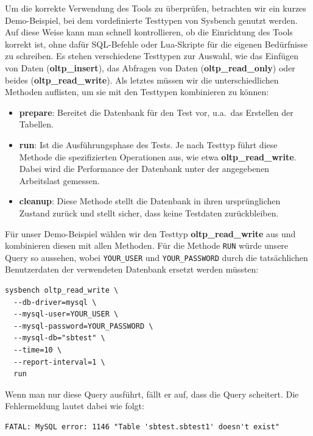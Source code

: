 Um die korrekte Verwendung des Tools zu überprüfen, betrachten wir ein kurzes Demo-Beispiel, bei dem vordefinierte Testtypen von Sysbench genutzt werden.
Auf diese Weise kann man schnell kontrollieren, ob die Einrichtung des Tools korrekt ist, ohne dafür SQL-Befehle oder Lua-Skripte für die eigenen Bedürfnisse zu schreiben.
Es stehen verschiedene Testtypen zur Auswahl, wie das Einfügen von Daten (\textbf{oltp\_insert}), das Abfragen von Daten (\textbf{oltp\_read\_only}) oder beides (\textbf{oltp\_read\_write}).
Als letztes müssen wir die unterschiedlichen Methoden auflisten, um sie mit den Testtypen kombinieren zu können:

\begin{itemize}
    \setlength{\itemsep}{-3pt}
    \item \textbf{prepare}: Bereitet die Datenbank für den Test vor, u.a.\ das Erstellen der Tabellen.
    \item \textbf{run}: Ist die Ausführungsphase des Tests.
    Je nach Testtyp führt diese Methode die spezifizierten Operationen aus, wie etwa \textbf{oltp\_read\_write}.
    Dabei wird die Performance der Datenbank unter der angegebenen Arbeitslast gemessen.
    \item \textbf{cleanup}: Diese Methode stellt die Datenbank in ihren ursprünglichen Zustand zurück und stellt sicher, dass keine Testdaten zurückbleiben.
\end{itemize}

Für unser Demo-Beispiel wählen wir den Testtyp \textbf{oltp\_read\_write} aus und kombinieren diesen mit allen Methoden.
Für die Methode \texttt{RUN} würde unsere Query so aussehen, wobei \texttt{YOUR\_USER} und \texttt{YOUR\_PASSWORD} durch die tatsächlichen Benutzerdaten der verwendeten Datenbank ersetzt werden müssten:

\vspace{-5pt}
\begin{lstlisting}[style=custom_daniel,label={lst:tools-sysbench-run}]
sysbench oltp_read_write \
  --db-driver=mysql \
  --mysql-user=YOUR_USER \
  --mysql-password=YOUR_PASSWORD \
  --mysql-db="sbtest" \
  --time=10 \
  --report-interval=1 \
  run
\end{lstlisting}
\vspace{-5pt}

Wenn man nur diese Query ausführt, fällt er auf, dass die Query scheitert.
Die Fehlermeldung lautet dabei wie folgt:

\begin{lstlisting}[style=custom_daniel,label={lst:tools-error-without-prepare}]
FATAL: MySQL error: 1146 "Table 'sbtest.sbtest1' doesn't exist"
\end{lstlisting}

